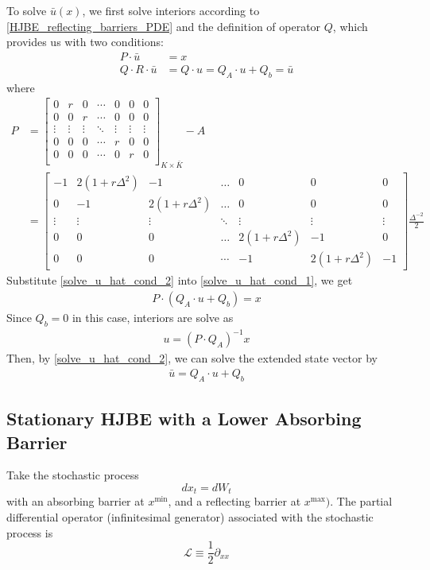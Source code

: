 \documentclass[11pt]{article}
\newcommand{\D}[1][]{\ensuremath{\partial_{#1}}}
\begin{document}
To solve $\bar{u}(x)$, we first solve interiors according to \eqref{HJBE_reflecting_barriers_PDE} and the definition of operator $Q$, which provides us with two conditions:
\begin{align}
P\cdot\bar{u} &= x\label{solve_u_hat_cond_1}\\
Q\cdot R\cdot\bar{u} &= Q\cdot u = Q_A\cdot u+Q_b = \bar{u}\label{solve_u_hat_cond_2}
\end{align}
where
\begin{align}
P &= \begin{bmatrix}
0&r&0&\cdots&0&0&0\\
0&0&r&\cdots&0&0&0\\
\vdots&\vdots&\vdots&\ddots&\vdots&\vdots&\vdots\\
0&0&0&\cdots&r&0&0\\
0&0&0&\cdots&0&r&0\\
\end{bmatrix}_{K\times\bar{K}}-A  \\
&= \begin{bmatrix}
-1&2(1+r\Delta^2)&-1&\dots&0&0&0\\
0&-1&2(1+r\Delta^2)&\dots&0&0&0\\
\vdots&\vdots&\vdots&\ddots&\vdots&\vdots&\vdots\\
0&0&0&\dots&2(1+r\Delta^2)&-1&0\\
0&0&0&\cdots&-1&2(1+r\Delta^2)&-1
\end{bmatrix}\frac{\Delta^{-2}}{2}
\end{align}
Substitute \eqref{solve_u_hat_cond_2} into \eqref{solve_u_hat_cond_1}, we get
\begin{align}
P\cdot(Q_A\cdot u+Q_b) = x
\end{align}
Since $Q_b = 0$ in this case, interiors are solve as
\begin{align}
u = (P\cdot Q_A)^{-1}x
\end{align}
Then, by \eqref{solve_u_hat_cond_2}, we can solve the extended state vector by
\begin{align}
\bar{u} = Q_A\cdot u+Q_b\label{solve_u_hat_in_terms_of_interiors}
\end{align}

\subsection{Stationary HJBE with a Lower Absorbing Barrier}
Take the stochastic process
$$
d x_t = d W_t
$$
with an absorbing barrier at $x^{\min}$, and a reflecting barrier at $x^{\max})$.  The partial differential operator (infinitesimal generator) associated with the stochastic process is
$$
\mathcal{L} \equiv \frac{1}{2}\D[xx]
$$
\end{document}

